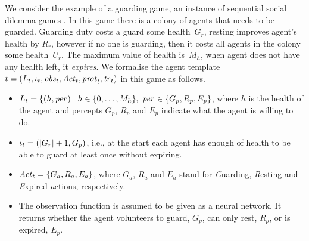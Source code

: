 

\begin{example}\em
  \label{ex:agent-template}

  We consider the example of a guarding game, an instance of sequential social
  dilemma games \cite{LeiboZLMG17}. In this game there is a colony of agents
  that needs to be guarded. Guarding duty costs a guard some health~$G_r$,
  resting improves agent's health by $R_r$, however if no one is guarding, then
  it costs all agents in the colony some health~$U_r$. The maximum value of
  health is~$M_h$, when agent does not have any health left, it \emph{expires}.
%
  We formalise the agent template
  ${t} = \left ( L_{t}, \iota_{t}, \mathit{obs}_{t}, \mathit{Act}_{t}, \mathit{prot}_{t}, \mathit{tr}_{t}  \right )$
  in this game as follows.

 
  \begin{itemize}[$\bullet$]\itemsep 0cm
  \item
    $L_{t} = \{(h,\mathit{per}_{}) \mid h \in \{0,\dots,M_h\}, \ \mathit{per}_{} \in \{G_p,
    R_p, E_p\}$, where $h$ is the health of the agent and percepts $G_p$, $R_p$
    and $E_p$ indicate what the agent is willing to do.

  \item $\iota_{t} = (|G_r| + 1, G_p)$, i.e., at the start each agent has enough
    of health to be able to guard at least once without expiring.
    
  \item $\mathit{Act}_{t} = \{G_a, R_a, E_a\}$, where $G_a$, $R_a$ and $E_a$ stand for
    \emph{G}uarding, \emph{R}esting and \emph{E}xpired \emph{a}ctions,
    respectively.
  

  \item The observation function is assumed to be given as a neural network. It
    returns whether the agent volunteers to guard, $G_p$, can only rest, $R_p$, or
    is expired, $E_p$.

    

\end{itemize}
\end{example}
